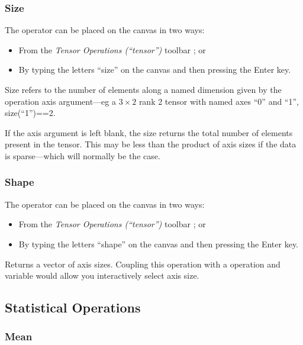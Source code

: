 \subsubsection{Size}

\label{Operation:size}


The operator can be placed on the canvas in two ways:
\begin{itemize}
\item From the \emph{Tensor Operations (``tensor'')} toolbar ;
or 
\item By typing the letters ``size'' on the canvas and then pressing the
Enter key.
\end{itemize}
Size refers to the number of elements along a named dimension given
by the operation axis argument---eg a $3\times2$ rank 2 tensor with
named axes ``0'' and ``1'', size(``1'')==2.

If the axis argument is left blank, the size returns the total number
of elements present in the tensor. This may be less than the product
of axis sizes if the data is sparse---which will normally be the
case.

\subsubsection{Shape}

\label{Operation:shape}


The operator can be placed on the canvas in two ways:
\begin{itemize}
\item From the \emph{Tensor Operations (``tensor'')} toolbar ;
or 
\item By typing the letters ``shape'' on the canvas and then pressing the
Enter key.
\end{itemize}
Returns a vector of axis sizes. Coupling this operation with a
 operation and variable would allow
you interactively select axis size.

\subsection{Statistical Operations}
\label{operations-statistics}

\subsubsection{Mean}

